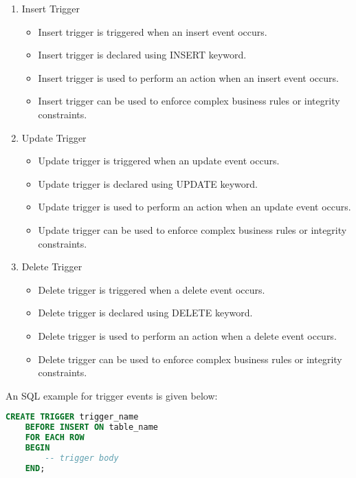 \documentclass[11pt]{article}
\begin{document}
\begin{enumerate}
    \item Insert Trigger
          \begin{itemize}
              \item Insert trigger is triggered when an insert event occurs.
              \item Insert trigger is declared using INSERT keyword.
              \item Insert trigger is used to perform an action when an insert event occurs.
              \item Insert trigger can be used to enforce complex business rules or integrity constraints.
          \end{itemize}

    \item Update Trigger
          \begin{itemize}
              \item Update trigger is triggered when an update event occurs.
              \item Update trigger is declared using UPDATE keyword.
              \item Update trigger is used to perform an action when an update event occurs.
              \item Update trigger can be used to enforce complex business rules or integrity constraints.
          \end{itemize}

    \item Delete Trigger
          \begin{itemize}
              \item Delete trigger is triggered when a delete event occurs.
              \item Delete trigger is declared using DELETE keyword.
              \item Delete trigger is used to perform an action when a delete event occurs.
              \item Delete trigger can be used to enforce complex business rules or integrity constraints.
          \end{itemize}

\end{enumerate}

An SQL example for trigger events is given below:
\begin{lstlisting}[language=sql]
CREATE TRIGGER trigger_name
    BEFORE INSERT ON table_name
    FOR EACH ROW
    BEGIN
        -- trigger body
    END;
\end{lstlisting}
\end{document}
